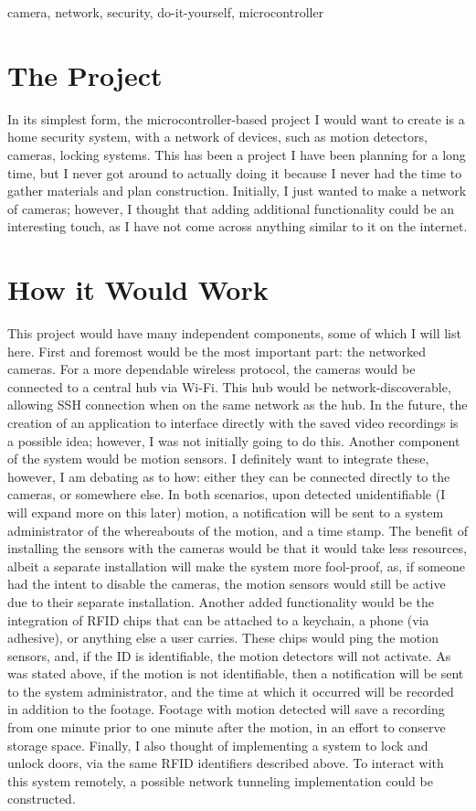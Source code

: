 \documentclass[conference]{IEEEtran}
\begin{document}
\begin{IEEEkeywords}
  camera, network, security, do-it-yourself, microcontroller
\end{IEEEkeywords}

\section{The Project}

In its simplest form, the microcontroller-based project I would want to create is a home security system, with a network of devices, such as motion detectors, cameras, locking systems. This has been a project I have been planning for a long time, but I never got around to actually doing it because I never had the time to gather materials and plan construction. Initially, I just wanted to make a network of cameras; however, I thought that adding additional functionality could be an interesting touch, as I have not come across anything similar to it on the internet.

\section{How it Would Work}

This project would have many independent components, some of which I will list here. First and foremost would be the most important part: the networked cameras. For a more dependable wireless protocol, the cameras would be connected to a central hub via Wi-Fi. This hub would be network-discoverable, allowing SSH connection when on the same network as the hub. In the future, the creation of an application to interface directly with the saved video recordings is a possible idea; however, I was not initially going to do this. Another component of the system would be motion sensors. I definitely want to integrate these, however, I am debating as to how: either they can be connected directly to the cameras, or somewhere else. In both scenarios, upon detected unidentifiable (I will expand more on this later) motion, a notification will be sent to a system administrator of the whereabouts of the motion, and a time stamp. The benefit of installing the sensors with the cameras would be that it would take less resources, albeit a separate installation will make the system more fool-proof, as, if someone had the intent to disable the cameras, the motion sensors would still be active due to their separate installation. Another added functionality would be the integration of RFID chips that can be attached to a keychain, a phone (via adhesive), or anything else a user carries. These chips would ping the motion sensors, and, if the ID is identifiable, the motion detectors will not activate. As was stated above, if the motion is not identifiable, then a notification will be sent to the system administrator, and the time at which it occurred will be recorded in addition to the footage. Footage with motion detected will save a recording from one minute prior to one minute after the motion, in an effort to conserve storage space. Finally, I also thought of implementing a system to lock and unlock doors, via the same RFID identifiers described above. To interact with this system remotely, a possible network tunneling implementation could be constructed.
\end{document}
